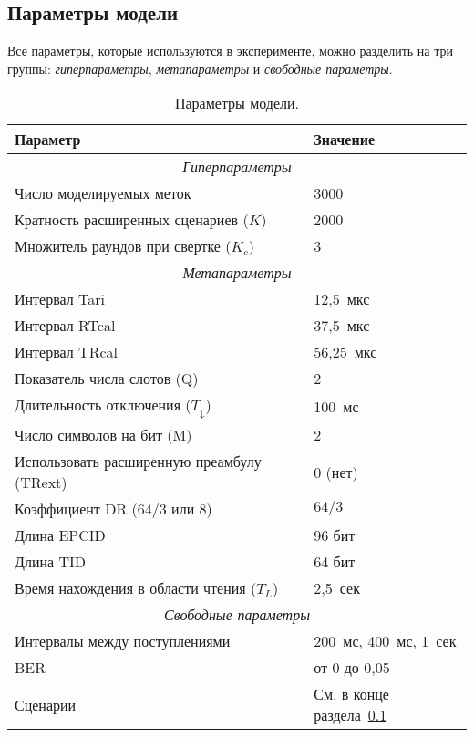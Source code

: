 \subsection{Параметры модели}\label{subsec:ch3_results_params}

Все параметры, которые используются в эксперименте, можно разделить на три группы: \textit{гиперпараметры}, \textit{метапараметры} и \textit{свободные параметры}.

\begin{table}[!t]
	\renewcommand{\arraystretch}{1.3}
	\caption{Параметры модели.}
	\label{table:ch3_results_params}
	\centering
	\begin{tabular}{|l|l|}
		\hline
		Параметр   & Значение \\\hline
		\multicolumn{2}{|c|}{\textit{Гиперпараметры}} \\\hline
		Число моделируемых меток              & 3000  \\\hline
		Кратность расширенных сценариев ($K$) & 2000  \\\hline
		Множитель раундов при свертке ($K_c$) & 3     \\\hline
		\multicolumn{2}{|c|}{\textit{Метапараметры}} \\\hline
		Интервал Tari                              & 12,5~мкс   \\\hline
		Интервал RTcal                             & 37,5~мкс   \\\hline
		Интервал TRcal                             & 56,25~мкс  \\\hline
		Показатель числа слотов (Q)                & 2          \\\hline
		Длительность отключения ($T_\downarrow$)   & 100~мс     \\\hline
		Число символов на бит (M)                  & 2          \\\hline
		Использовать расширенную преамбулу (TRext) & 0 (нет)    \\\hline
		Коэффициент DR ($64/3$ или 8)              & $64/3$     \\\hline
		Длина EPCID                                & 96 бит     \\\hline
		Длина TID                                  & 64 бит     \\\hline
		Время нахождения в области чтения ($T_L$)  & 2,5~сек    \\\hline
		\multicolumn{2}{|c|}{\textit{Свободные параметры}} \\\hline
		Интервалы между поступлениями   & 200~мс, 400~мс, 1~сек \\\hline
		BER                             & от 0 до 0,05 \\\hline
		Сценарии                        & См. в конце раздела~\ref{subsec:ch3_results_params} \\\hline
	\end{tabular}
\end{table}

